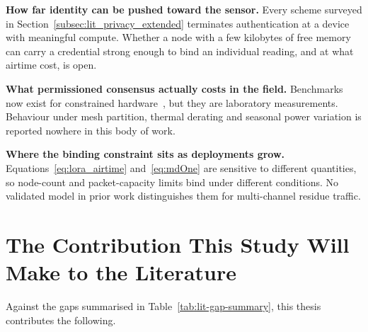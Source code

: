 \documentclass[12pt,a4paper,oneside]{book}
\begin{document}
\textbf{How far identity can be pushed toward the sensor.} Every scheme
surveyed in Section~\ref{subsec:lit_privacy_extended} terminates authentication
at a device with meaningful compute. Whether a node with a few kilobytes of
free memory can carry a credential strong enough to bind an individual reading,
and at what airtime cost, is open.

\textbf{What permissioned consensus actually costs in the
field.} Benchmarks now exist for constrained
hardware~\cite{zulkarnain2025performancebenchmarking,
pebriyanti2025evaluationscalability}, but they are laboratory measurements.
Behaviour under mesh partition, thermal derating and seasonal power variation
is reported nowhere in this body of work.

\textbf{Where the binding constraint sits as deployments grow.}
Equations~\ref{eq:lora_airtime} and~\ref{eq:mdOne} are sensitive to
different quantities, so node-count and packet-capacity limits bind under
different conditions. No validated model in prior work distinguishes
them for multi-channel residue traffic.

\section{The Contribution This Study Will Make to the Literature}
\label{sec:lit_contribution}

Against the gaps summarised in Table~\ref{tab:lit-gap-summary}, this thesis
contributes the following.
\end{document}
